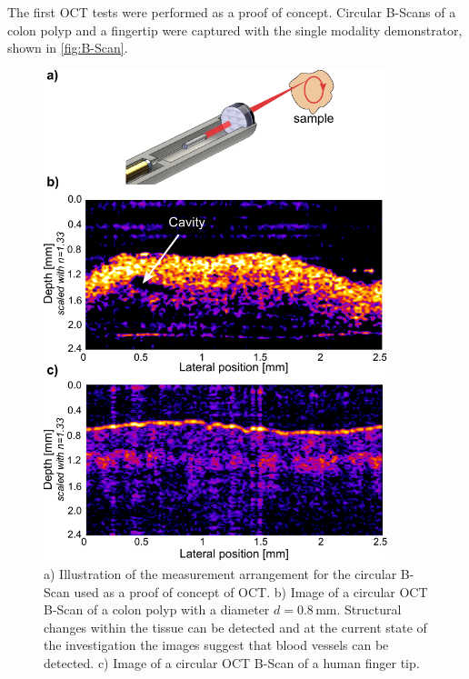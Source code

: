 The first OCT tests were performed as a proof of concept. Circular B-Scans of a colon polyp and a fingertip were captured with the single modality demonstrator, shown in \autoref{fig:B-Scan}. 

\begin{figure}[h!]\centering \includegraphics[width=10cm]{figures/50_Measurements/oct/OCT_Measurement_arrangement.pdf}
      \caption{a) Illustration of the measurement arrangement for the circular B-Scan used as a proof of concept of OCT. b) Image of a circular OCT B-Scan of a colon polyp with a diameter $d=0.8\,\text{mm}$. Structural changes within the tissue can be detected and at the current state of the investigation the images suggest that blood vessels can be detected.
      c) Image of a circular OCT B-Scan of a human finger tip.}
      \label{fig:B-Scan}
\end{figure}